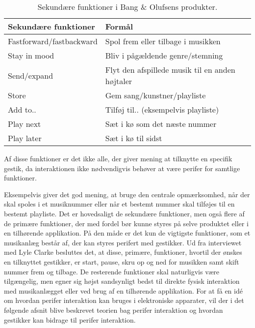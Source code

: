 \noindent
%
%
\begin{table}[H]
	\centering
	\begin{tabular}{ | l | p{8cm} |}
		\hline
		\multicolumn{1}{|l|}{\textbf{Sekundære funktioner}} & \multicolumn{1}{l|}{\textbf{Formål}} \\ \hline
		Fastforward/fastbackward & Spol frem eller tilbage i musikken \\ \hline
		Stay in mood & Bliv i pågældende genre/stemning \\ \hline
		Send/expand & Flyt den afspillede musik til en anden højtaler \\ \hline
		Store & Gem sang/kunstner/playliste \\ \hline
		Add to.. & Tilføj til.. (eksempelvis playliste) \\ \hline
		Play next & Sæt i kø som det næste nummer \\ \hline
		Play later & Sæt i kø til sidst \\ \hline
	\end{tabular}
	\caption{Sekundære funktioner i Bang $\&$ Olufsens produkter.}
	\label{tab:BogOsSekundaereFunktioner}
\end{table}
\noindent
%
Af disse funktioner er det ikke alle, der giver mening at tilknytte en specifik gestik, da interaktionen ikke nødvendigvis behøver at være perifer for samtlige funktioner. 

Eksempelvis giver det god mening, at bruge den centrale opmærksomhed, når der skal spoles i et musiknummer eller når et bestemt nummer skal tilføjes til en bestemt playliste. Det er hovedsaligt de sekundære funktioner, men også flere af de primære funktioner, der med fordel bør kunne styres på selve produktet eller i en tilhørende applikation. På den måde er det kun de vigtigste funktioner, som et musikanlæg består af, der kan styres perifert med gestikker. Ud fra interviewet med Lyle Clarke besluttes det, at disse, primære, funktioner, hvortil der ønskes en tilknyttet gestikker, er start, pause, skru op og ned for musikken samt skift nummer frem og tilbage. De resterende funktioner skal naturligvis være tilgængelig, men egner sig højst sandsynligt bedst til direkte fysisk interaktion med musikanlægget eller ved brug af en tilhørende applikation.\blankline
%
For at få en idé om hvordan perifer interaktion kan bruges i elektroniske apparater, vil der i det følgende afsnit blive beskrevet teorien bag perifer interaktion og hvordan gestikker kan bidrage til perifer interaktion. 

